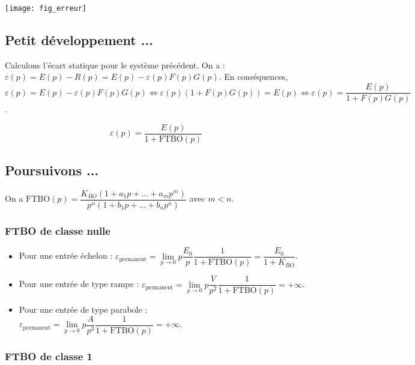 \begin{center}
\texttt{[image: fig\_erreur]}
\end{center}

\subsection*{Petit développement ...}

Calculons l'écart statique pour le système précédent. On a : $\varepsilon(p)=E(p)-R(p)=E(p)-\varepsilon(p) F(p) G(p)$. En conséquences,
$\varepsilon(p)=E(p)-\varepsilon(p) F(p) G(p) 
\Longleftrightarrow \varepsilon(p)\left( 1+F(p) G(p) \right) =E(p) 
\Longleftrightarrow   \varepsilon(p) =\dfrac{E(p)}{1+F(p) G(p)}$.

\begin{resultat}
$$\varepsilon(p) =\dfrac{E(p)}{1+\text{FTBO}(p)}$$
\end{resultat}


\subsection*{Poursuivons ...}
On a $\text{FTBO}(p)=\dfrac{K_{BO}\left(1+a_1p+...+a_mp^m \right)}{p^{\alpha}\left(1+b_1p+...+b_np^n\right)}$ avec $m< n$.
\subsubsection*{FTBO de classe nulle}

\begin{itemize}
\item Pour une entrée échelon : 
$\varepsilon_{\text{permanent}}=\lim\limits_{p\to 0} p\dfrac{E_0}{p}\dfrac{1}{1+\text{FTBO}(p)} 
= \dfrac{E_0}{1+K_{BO}}$.
\item Pour une entrée de type rampe : 
$\varepsilon_{\text{permanent}}=\lim\limits_{p\to 0} p\dfrac{V}{p^2}\dfrac{1}{1+\text{FTBO}(p)} 
=+\infty$.
\item Pour une entrée de type parabole : 
$\varepsilon_{\text{permanent}}=\lim\limits_{p\to 0} p\dfrac{A}{p^3}\dfrac{1}{1+\text{FTBO}(p)} 
=+\infty$.
\end{itemize}

\subsubsection*{FTBO de classe 1}

